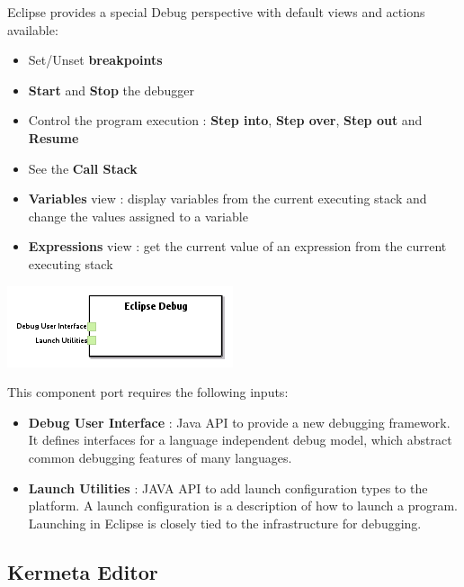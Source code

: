 \documentclass{gemoc} %
\begin{document}
Eclipse provides a special Debug perspective with default views and actions available:
\begin{itemize}
\item Set/Unset \textbf{breakpoints}
\item \textbf{Start} and \textbf{Stop} the debugger
\item Control the program execution : \textbf{Step into}, \textbf{Step over}, \textbf{Step out} and \textbf{Resume}
\item See the \textbf{Call Stack}
\item \textbf{Variables} view : display variables from the current executing stack and change the values assigned to a variable
\item \textbf{Expressions} view : get the current value of an expression from the current executing stack
\end{itemize}
\begin{center}
\includegraphics*[trim=0.0cm 0.0cm 0cm 0.0cm, clip=true]{../images/generated/Generated_Eclipse_Debug.png}
\end{center}

This component port requires the following inputs:
\begin{itemize}
  \item \textbf{Debug User Interface} :
Java API to provide a new debugging framework. It defines interfaces for a language independent debug model, which abstract common debugging features of many languages. 
  \item \textbf{Launch Utilities} :
JAVA API to add launch configuration types to the platform. A launch configuration is a description of how to launch a program. Launching in Eclipse is closely tied to the infrastructure for debugging.
\end{itemize}


\subsection{Kermeta Editor}
\end{document}
